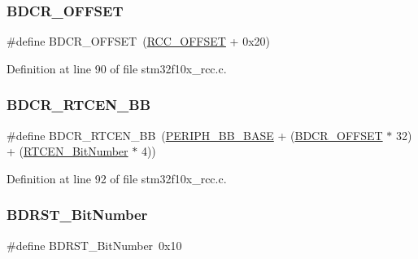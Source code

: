 \subsubsection{\texorpdfstring{B\+D\+C\+R\+\_\+\+O\+F\+F\+S\+ET}{BDCR\_OFFSET}}
{\footnotesize\ttfamily \#define B\+D\+C\+R\+\_\+\+O\+F\+F\+S\+ET~(\hyperlink{group___r_c_c___private___defines_ga539e07c3b3c55f1f1d47231341fb11e1}{R\+C\+C\+\_\+\+O\+F\+F\+S\+ET} + 0x20)}



Definition at line 90 of file stm32f10x\+\_\+rcc.\+c.

\mbox{\label{group___r_c_c___private___defines_gaf70aaf70b0752ccb3a60307b2fb46038}} 
\subsubsection{\texorpdfstring{B\+D\+C\+R\+\_\+\+R\+T\+C\+E\+N\+\_\+\+BB}{BDCR\_RTCEN\_BB}}
{\footnotesize\ttfamily \#define B\+D\+C\+R\+\_\+\+R\+T\+C\+E\+N\+\_\+\+BB~(\hyperlink{group___peripheral__memory__map_gaed7efc100877000845c236ccdc9e144a}{P\+E\+R\+I\+P\+H\+\_\+\+B\+B\+\_\+\+B\+A\+SE} + (\hyperlink{group___r_c_c___private___defines_ga5f8a0c3cb5f5c835bf7eef09515138ad}{B\+D\+C\+R\+\_\+\+O\+F\+F\+S\+ET} $\ast$ 32) + (\hyperlink{group___r_c_c___private___defines_ga9302c551752124766afc4cee65436405}{R\+T\+C\+E\+N\+\_\+\+Bit\+Number} $\ast$ 4))}



Definition at line 92 of file stm32f10x\+\_\+rcc.\+c.

\mbox{\label{group___r_c_c___private___defines_gae6718158034388d8fde8caaa28ffe8b9}} 
\subsubsection{\texorpdfstring{B\+D\+R\+S\+T\+\_\+\+Bit\+Number}{BDRST\_BitNumber}}
{\footnotesize\ttfamily \#define B\+D\+R\+S\+T\+\_\+\+Bit\+Number~0x10}



